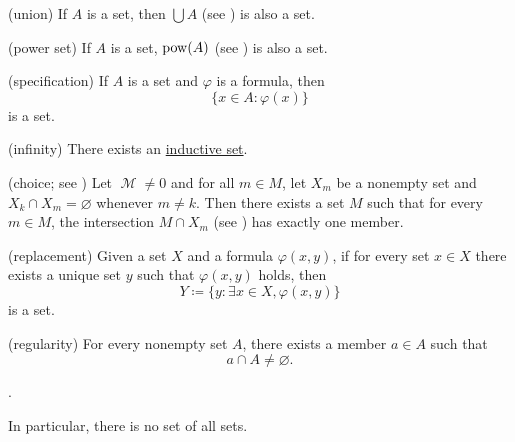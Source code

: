 \begin{definition}
\begin{thmenum}
    (union) If \( A \) is a set, then \( \bigcup A \) (see ) is also a set.

    (power set) If \( A \) is a set, \( \operatorname{pow}(A) \) (see ) is also a set.

    (specification) If \( A \) is a set and \( \varphi \) is a formula, then
    \begin{equation*}
      \{ x \in A \colon \varphi(x) \}
    \end{equation*}
    is a set.

    (infinity) There exists an \hyperref[def:inductive_set]{inductive set}.

    (choice; see ) Let \( \mscrM \neq 0 \) and for all \( m \in M \), let \( X_m \) be a nonempty set and \( X_k \cap X_m = \varnothing \) whenever \( m \neq k \). Then there exists a set \( M \) such that for every \( m \in M \), the intersection \( M \cap X_m \) (see ) has exactly one member.

    (replacement) Given a set \( X \) and a formula \( \varphi(x, y) \), if for every set \( x \in X \) there exists a unique set \( y \) such that \( \varphi(x, y) \) holds, then
    \begin{equation*}
      Y \coloneqq \{ y \colon \exists x \in X, \varphi(x, y) \}
    \end{equation*}
    is a set.

    (regularity) For every nonempty set \( A \), there exists a member \( a \in A \) such that
    \begin{equation*}
      a \cap A \neq \varnothing.
    \end{equation*}
  \end{thmenum}
\end{definition}

\begin{proposition}\label{thm:zfc_no_set_is_member_of_itself}
  .

  In particular, there is no set of all sets.
\end{proposition}

